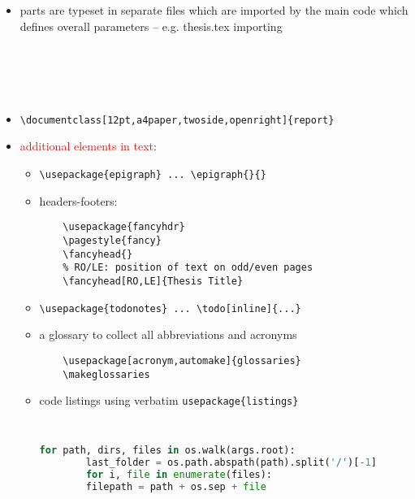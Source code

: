 \documentclass[a4paper,11pt]{article}
\begin{document}
\begin{itemize}
	\item parts are typeset in separate files which are imported by the main code which defines overall parameters -- e.g. thesis.tex importing 
	
	\begin{lstlisting}
	 
	
	
	
	\end{lstlisting}
	
	\item \verb|\documentclass[12pt,a4paper,twoside,openright]{report}|
	\item \textcolor{red}{additional elements in text}:
	
	\begin{itemize}
		\item \verb|\usepackage{epigraph} ... \epigraph{}{}|
		\item headers-footers: 
			\begin{lstlisting}
	\usepackage{fancyhdr}
	\pagestyle{fancy}
	\fancyhead{}
	% RO/LE: position of text on odd/even pages
	\fancyhead[RO,LE]{Thesis Title}	
			\end{lstlisting}
			
		\item \verb|\usepackage{todonotes} ... \todo[inline]{...}|
		
		\item a glossary to collect all abbreviations and acronyms 
		\begin{lstlisting}
	\usepackage[acronym,automake]{glossaries}
	\makeglossaries
		\end{lstlisting}
		
		\item code listings using verbatim \verb|usepackage{listings}|

		\begin{lstlisting}
	
		\end{lstlisting}
		
	

		\begin{lstlisting}[language=Python, caption=Looping thru all folders under 'root']
		for path, dirs, files in os.walk(args.root):
		last_folder = os.path.abspath(path).split('/')[-1]
		for i, file in enumerate(files):
		filepath = path + os.sep + file
		
		\end{lstlisting}

	\end{itemize}
\end{itemize}
\end{document}
